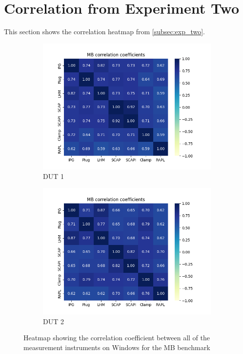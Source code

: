 \section*{Correlation from Experiment Two}\label{app:cor_exp_two}

This section shows the correlation heatmap from \cref{subsec:exp_two}.

\begin{figure}[H]
    \centering
    \begin{subfigure}[b]{0.49\textwidth}
        \centering
        \includegraphics[width=\textwidth]{figures/MandelbrotDut1.png}
        \caption{DUT 1}
    \end{subfigure}
    \hfill
    \begin{subfigure}[b]{0.49\textwidth}
        \centering
        \includegraphics[width=\textwidth]{figures/MandelbrotDut2.png}
        \caption{DUT 2}
    \end{subfigure}
    \caption{Heatmap showing the correlation coefficient between all of the measurement instruments on Windows for the MB benchmark}
\end{figure}

